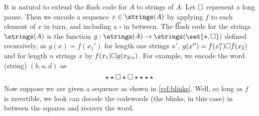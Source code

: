 It is natural to extend the flash code for $A$ to strings of $A$.
Let $\square$ represent a long pause.
Then we encode a sequence $x \in \strings(A)$ by applying $f$ to each element of $x$ in turn, and including a $\square$ in between.
The \t{flash code} for the strings $\strings(A)$ is the function $g: \strings(A) \to \strings(\set{\blink, \pause})$ defined recursively, as $g(x) = f(x_1')$ for length one strings $x'$, $g(x'') = f(x_1'')\square f(x_2)$ and for length $n$ strings $x$ by $f(x_1)\square g(x_{2:n})$.
For example, we encode the word (string) $(b,a,d)$ as
\begin{equation}
  \star
  \star
  \square
  \star
  \square
  \star
  \star
  \star
  \star
  \label{ref:blinks}
\end{equation}
Now suppose we are given a sequence as shown in \eqref{ref:blinks}.
Well, so long as $f$ is invertible, we look can decode the codewords (the blinks, in this case) in between the squares and recover the word.
